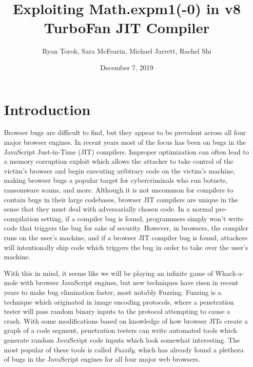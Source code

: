 \documentclass[11pt]{article}
\title{Exploiting Math.expm1(-0) in v8 TurboFan JIT Compiler}
\author{Ryan Torok, Sara McFearin, Michael Jarrett, Rachel Shi}
\date{December 7, 2019}
\begin{document}
\maketitle
\section{Introduction}
Browser bugs are difficult to find, but they appear to be prevalent across all four major browser
engines. In recent years most of the focus has been on bugs in the JavaScript Just-in-Time (JIT)
compilers. Improper optimization can often lead to a memory corruption exploit which allows the
attacker to take control of the victim's browser and begin executing aribtrary code on the victim's
machine, making browser bugs a popular target for cybercriminals who run botnets, ransomware scams,
and more. Although it is not uncommon for compilers to contain bugs in their large codebases,
browser JIT compilers are unique in the sense that they must deal with adversarially chosen code. In
a normal pre-compilation setting, if a compiler bug is found, programmers simply won't write code
that triggers the bug for sake of security. However, in browsers, the compiler runs on the user's
machine, and if a browser JIT compiler bug is found, attackers will intentionally ship code which
triggers the bug in order to take over the user's machine. 

With this in mind, it seems like we will be playing an infinite game of Whack-a-mole with browser
JavaScript engines, but new techniques have risen in recent years to make bug elimination faster,
most notably Fuzzing. Fuzzing is a technique which originated in image encoding protocols, where a
penetration tester will pass random binary inputs to the protocol attempting to cause a crash. With
some modifications based on knowledge of how browser JITs create a graph of a code segment,
penetration testers can write automated tools which generate random JavaScript code inputs which
look somewhat interesting. The most popular of these tools is called \textit{Fuzzily}, which has
already found a plethora of bugs in the JavaScript engines for all four major web browsers.
\end{document}
